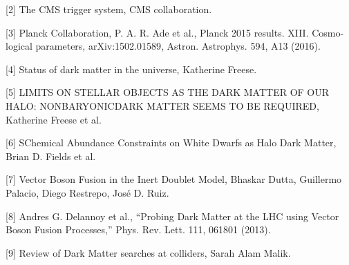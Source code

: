 [2] The CMS trigger system, CMS collaboration.

\vspace{0.5cm}

[3] Planck Collaboration, P. A. R. Ade et al., Planck 2015 results. XIII. Cosmo-
logical parameters, arXiv:1502.01589, Astron. Astrophys. 594, A13 (2016).

\vspace{0.5cm}

[4] Status of dark matter in the universe, Katherine Freese.

\vspace{0.5cm}

[5] LIMITS ON STELLAR OBJECTS AS THE DARK MATTER OF OUR HALO: NONBARYONICDARK MATTER SEEMS TO BE REQUIRED, Katherine Freese et al.

\vspace{0.5cm}

[6] SChemical Abundance Constraints on White Dwarfs as Halo Dark Matter, Brian D. Fields et al.

\vspace{0.5cm}

[7] Vector Boson Fusion in the Inert Doublet Model, Bhaskar Dutta, Guillermo Palacio, Diego Restrepo, José D. Ruiz.

\vspace{0.5cm}

[8] Andres G. Delannoy et al., “Probing Dark Matter at the LHC using Vector Boson Fusion
Processes,” Phys. Rev. Lett. 111, 061801 (2013).

\vspace{0.5cm}

[9] Review of Dark Matter searches at colliders, Sarah Alam Malik.


